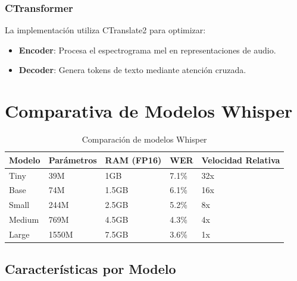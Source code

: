 \subsubsection{CTransformer}
La implementación utiliza CTranslate2 para optimizar:
\begin{itemize}
	\item \textbf{Encoder}: Procesa el espectrograma mel en representaciones de audio.
	\item \textbf{Decoder}: Genera tokens de texto mediante atención cruzada.
\end{itemize}

\section{Comparativa de Modelos Whisper}
\label{sec:whisper-models-comparison}

\begin{table}[H]
	\label{tab:whisper-models}
	\begin{tabular}{|p{2cm}|p{2cm}|p{3cm}|p{3cm}|p{3cm}|}
		\hline
		\textbf{Modelo} & \textbf{Parámetros} & \textbf{RAM (FP16)} & \textbf{WER} & \textbf{Velocidad Relativa} \\
		\hline
		Tiny            & 39M                 & 1GB                 & 7.1\%        & 32x                         \\
		\hline
		Base            & 74M                 & 1.5GB               & 6.1\%        & 16x                         \\
		\hline
		Small           & 244M                & 2.5GB               & 5.2\%        & 8x                          \\
		\hline
		Medium          & 769M                & 4.5GB               & 4.3\%        & 4x                          \\
		\hline
		Large           & 1550M               & 7.5GB               & 3.6\%        & 1x                          \\
		\hline
	\end{tabular}
	\caption{Comparación de modelos Whisper}
\end{table}

\subsection{Características por Modelo}
\label{subsec:model-features}

